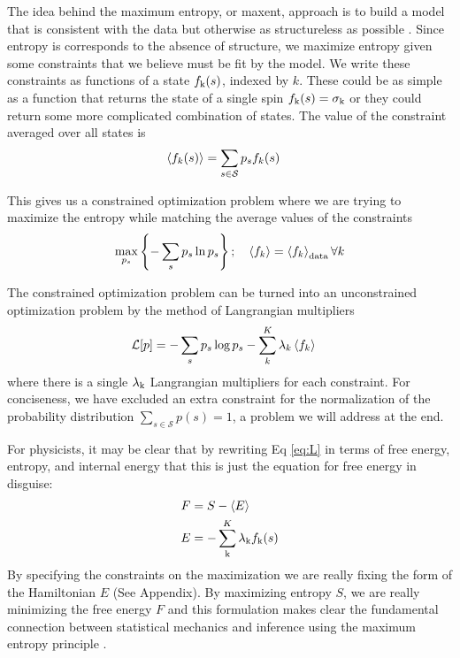 \documentclass[aps,prl,twocolumn]{revtex4-1}
\begin{document}
The idea behind the maximum entropy, or maxent, approach is to build a model that is consistent with the data but otherwise as structureless as possible \cite{Bretthorst:2003ua,Jaynes:1957fy}. Since entropy is corresponds to the absence of structure, we maximize entropy given some constraints that we believe must be fit by the model. We write these constraints as functions of a state $f_{\rm k}(s)$, indexed by $k$. These could be as simple as a function that returns the state of a single spin $f_{\rm k}(s) = \sigma_{\rm k}$ or they could return some more complicated combination of states. 
The value of the constraint averaged over all states is
\begin{align}
	\left<f_k(s)\right> &= \sum_{s\in \mathcal{S}} p_s f_k(s)
\end{align}

This gives us a constrained optimization problem where we are trying to maximize the entropy while matching the average values of the constraints
\begin{align}
	\max_{p_s} \left\{-\sum_s p_s \ln p_s\right\}; \quad \left<f_k\right>=\left<f_k\right>_{\rm data}\forall k
\end{align}

The constrained optimization problem can be turned into an unconstrained optimization problem by the method of Langrangian multipliers
\begin{align}
	\mathcal{L}[p] &= -\sum_s p_s\log p_s - \sum_k^K \lambda_k \left<f_k\right>\label{eq:L}
\end{align}
where there is a single $\lambda_{\rm k}$ Langrangian multipliers for each constraint. For conciseness, we have excluded an extra constraint for the normalization of the probability distribution $\sum_{s\in\mathcal{S}} p(s) = 1$, a problem we will address at the end.

For physicists, it may be clear that by rewriting Eq \ref{eq:L} in terms of free energy, entropy, and internal energy that this is just the equation for free energy in disguise:
\begin{align}
	F &= S - \left<E\right>\\
	E &= -\sum_{\rm k}^K\lambda_{\rm k}f_{\rm k}(s)
\end{align}
By specifying the constraints on the maximization we are really fixing the form of the Hamiltonian $E$ (See Appendix). By maximizing entropy $S$, we are really minimizing the free energy $F$ and this formulation makes clear the fundamental connection between statistical mechanics and inference using the maximum entropy principle \cite{Jaynes:1957fy}.
\end{document}
